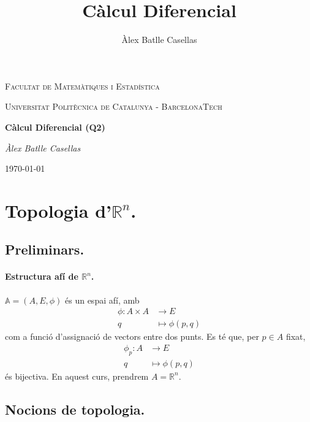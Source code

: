 \documentclass[11pt]{article}
\title{Càlcul Diferencial}
\author{Àlex Batlle Casellas}
\begin{document}
\begin{titlepage}
	\centering
	{\scshape\LARGE Facultat de Matemàtiques i Estadística \par}
	\vspace{1cm}
	{\scshape\Large Universitat Politècnica de Catalunya - BarcelonaTech\par}
	\vspace{1.5cm}
	{\huge\bfseries Càlcul Diferencial (Q2)
	\par}
	\vspace{2cm}
	{\Large\itshape Àlex Batlle Casellas\par}

	\vfill

	{\large \today\par}
\end{titlepage}


\vfill
\newpage\tableofcontents
\newpage
\section{Topologia d'$\mathbb{R}^n$.}
\subsection*{Preliminars.}
\paragraph{Estructura afí de $\mathbb{R}^n$.}
$\mathbb{A}=(A,E,\phi)$ és un espai afí, amb
\begin{align*}
		\phi \colon A\times A &\to E\\
		q &\mapsto \phi(p,q)
\end{align*}
com a funció d'assignació de vectors entre dos punts. Es té que, per $p\in A$ fixat,
\begin{align*}
		\phi_p \colon A &\to E\\
		q &\mapsto \phi(p,q)
\end{align*}
és bijectiva. En aquest curs, prendrem $A=\mathbb{R}^n$.
\subsection{Nocions de topologia.}
\end{document}
